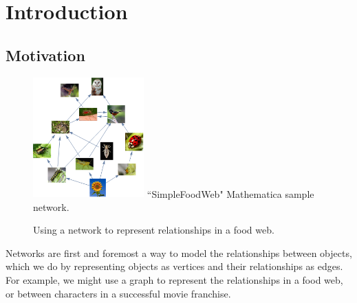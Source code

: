 \documentclass[12pt]{thesis}
\theoremstyle{plain}
\theoremstyle{definition}
\theoremstyle{remark}
\begin{document}

\tableofcontents
\listoftables
\listoffigures
\mainmatter
















\chapter{Introduction}\label{chapter:introduction_and_background}

\section{Motivation}

\begin{figure}
\centering
\vspace{-20pt}
\includegraphics[width=0.38\textwidth]{foodweb.png}
\scriptsize
``SimpleFoodWeb" Mathematica sample network.
\caption{Using a network to represent relationships in a food web.}
\vspace{-20pt}
\label{fig:foodweb}
\end{figure}

Networks are first and foremost a way to model the relationships between objects, which we do by representing objects as vertices and their relationships as edges. For example, we might use a graph to represent the relationships in a food web, or between characters in a successful movie franchise.
\end{document}
